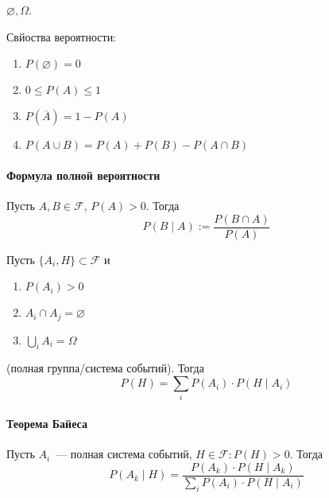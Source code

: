 \documentclass[12pt,timbord]{../../../notes}
\begin{document}
\begin{defn}\label{defn:prob::indep::triv}
  $\varnothing, \Omega$.
\end{defn}

\begin{prop}\label{prop:prob::ax::probprop}
  Свйоства вероятности:
  \begin{enumerate}
    \item $P(\varnothing) = 0$
    \item $0 \leqslant P(A) \leqslant 1$
    \item $ P(\overline{A}) = 1- P(A)$
    \item $ P(A\cup B) = P(A) + P(B) - P(A\cap B)$
  \end{enumerate}
\end{prop}

\paragraph{Формула полной вероятности}
\label{par:prob::compl}

\begin{defn}\label{defn:prob::compl::condprob}
  Пусть $A, B \in \mathcal F$, $P(A) > 0$. Тогда
  \[
    P(B \mid A) := \frac{P(B\cap A)}{P(A)} 
  \]
\end{defn}

\begin{prop}\label{prop:prob::compl::form}
  Пусть $\{A_i, H\} \subset \mathcal F$ и
  \begin{enumerate}
    \item $P(A_i) > 0$
    \item $A_i \cap A_j = \varnothing$
    \item $\bigcup_i A_i = \Omega$
  \end{enumerate}
  (полная группа/система событий). Тогда
  \[
    P(H)=\sum_i P(A_i)\cdot P(H\mid A_i)
  \]
\end{prop}

\paragraph{Теорема Байеса}
\label{par:prob::bayes}

\begin{thrm}\label{thrm:prob::bayes}
  Пусть $A_i$~--- полная система событий, $H\in \mathcal F\colon P(H)>0$. Тогда 
  \[
    P(A_k \mid H) = \frac{P(A_k)\cdot P(H \mid A_k)}{\sum_i P(A_i)\cdot P(H\mid A_i)} 
  \]
\end{thrm}
\end{document}
